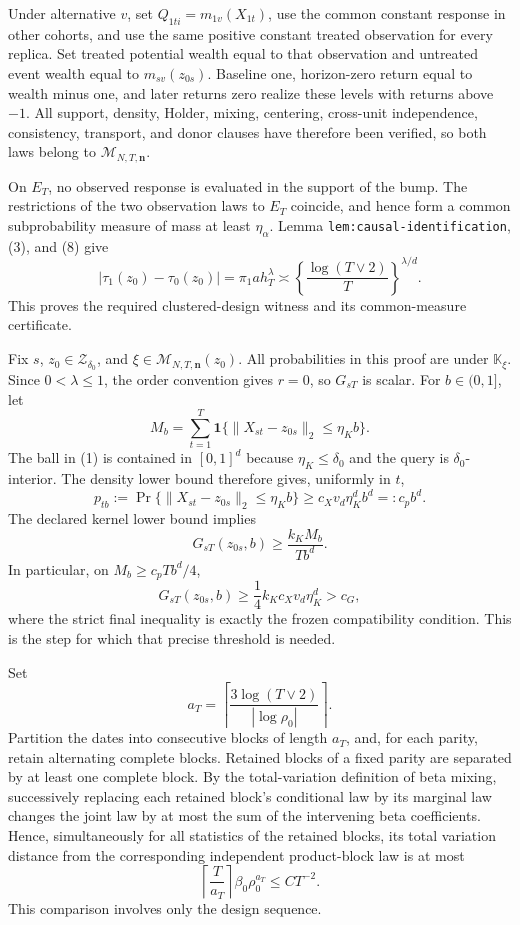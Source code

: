 Under alternative \(v\), set \(Q_{1ti}=m_{1v}(X_{1t})\), use the common constant response in other cohorts, and use the same positive constant treated observation for every replica.  Set treated potential wealth equal to that observation and untreated event wealth equal to \(m_{sv}(z_{0s})\).  Baseline one, horizon-zero return equal to wealth minus one, and later returns zero realize these levels with returns above \(-1\).  All support, density, Holder, mixing, centering, cross-unit independence, consistency, transport, and donor clauses have therefore been verified, so both laws belong to \(\mathcal M_{N,T,\mathbf n}\).

On \(E_T\), no observed response is evaluated in the support of the bump.  The restrictions of the two observation laws to \(E_T\) coincide, and hence form a common subprobability measure of mass at least \(\eta_\alpha\).  Lemma \texttt{lem:causal-identification}, (3), and (8) give
\[
 |\tau_1(z_0)-\tau_0(z_0)|
 =\pi_1ah_T^\lambda
 \asymp\left\{\frac{\log(T\vee2)}{T}\right\}^{\lambda/d}. \tag{9}
\]
This proves the required clustered-design witness and its common-measure certificate.

Fix \(s\), \(z_0\in\mathcal Z_{\delta_0}\), and
\(\xi\in\mathcal M_{N,T,\mathbf n}(z_0)\).  All probabilities in this proof are under \(\mathbb K_\xi\).  Since \(0<\lambda\le1\), the order convention gives \(r=0\), so \(G_{sT}\) is scalar.  For \(b\in(0,1]\), let
\[
 M_b=\sum_{t=1}^{T}
 \mathbf1\{\|X_{st}-z_{0s}\|_2\le\eta_Kb\}.               \tag{1}
\]
The ball in (1) is contained in \([0,1]^d\) because
\(\eta_K\le\delta_0\) and the query is \(\delta_0\)-interior.  The density lower bound therefore gives, uniformly in \(t\),
\[
 p_{tb}:=\Pr\{\|X_{st}-z_{0s}\|_2\le\eta_Kb\}
 \ge c_Xv_d\eta_K^db^d=:c_pb^d.                            \tag{2}
\]
The declared kernel lower bound implies
\[
 G_{sT}(z_{0s},b)
 \ge\frac{k_KM_b}{Tb^d}.                                   \tag{3}
\]
In particular, on \(M_b\ge c_pTb^d/4\),
\[
 G_{sT}(z_{0s},b)\ge\frac14k_Kc_Xv_d\eta_K^d>c_G,          \tag{4}
\]
where the strict final inequality is exactly the frozen compatibility condition.  This is the step for which that precise threshold is needed.

Set
\[
 a_T=\left\lceil\frac{3\log(T\vee2)}{|\log\rho_0|}\right\rceil. \tag{5}
\]
Partition the dates into consecutive blocks of length \(a_T\), and, for each parity, retain alternating complete blocks.  Retained blocks of a fixed parity are separated by at least one complete block.  By the total-variation definition of beta mixing, successively replacing each retained block's conditional law by its marginal law changes the joint law by at most the sum of the intervening beta coefficients.  Hence, simultaneously for all statistics of the retained blocks, its total variation distance from the corresponding independent product-block law is at most
\[
 \left\lceil\frac{T}{a_T}\right\rceil
 \beta_0\rho_0^{a_T}\le CT^{-2}.                           \tag{6}
\]
This comparison involves only the design sequence.

